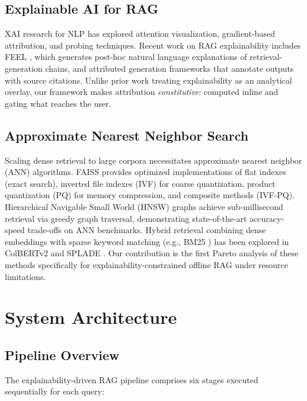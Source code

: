 \documentclass[conference]{IEEEtran}
\begin{document}
\subsection{Explainable AI for RAG}

XAI research for NLP \cite{minaee2024xai,rahman2026survey} has explored attention visualization, gradient-based attribution, and probing techniques. Recent work on RAG explainability includes FEEL \cite{zhang2024feel}, which generates post-hoc natural language explanations of retrieval-generation chains, and attributed generation frameworks \cite{agrawal2024attributed} that annotate outputs with source citations. Unlike prior work treating explainability as an analytical overlay, our framework makes attribution \emph{constitutive}: computed inline and gating what reaches the user.

\subsection{Approximate Nearest Neighbor Search}

Scaling dense retrieval to large corpora necessitates approximate nearest neighbor (ANN) algorithms. FAISS \cite{johnson2019faiss} provides optimized implementations of flat indexes (exact search), inverted file indexes (IVF) for coarse quantization, product quantization (PQ) for memory compression, and composite methods (IVF-PQ). Hierarchical Navigable Small World (HNSW) graphs \cite{malkov2018hnsw} achieve sub-millisecond retrieval via greedy graph traversal, demonstrating state-of-the-art accuracy-speed trade-offs on ANN benchmarks. Hybrid retrieval combining dense embeddings with sparse keyword matching (e.g., BM25 \cite{robertson2009bm25}) has been explored in ColBERTv2 \cite{santhanam2022colbertv2} and SPLADE \cite{formal2021splade}. Our contribution is the first Pareto analysis of these methods specifically for explainability-constrained offline RAG under resource limitations.

\section{System Architecture}

\subsection{Pipeline Overview}

The explainability-driven RAG pipeline comprises six stages executed sequentially for each query:
\end{document}
